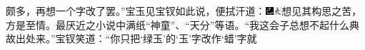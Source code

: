 颇多，再想一个字改了罢。''宝玉见宝钗如此说，便拭汗道：{\includegraphics[width=3mm]{../Images/00003}\includegraphics[width=3mm]{../Images/00012}\footnotesize \kaishu 想见其构思之苦，方是至情。最厌近之小说中满纸``神童''、``天分''等语。}``我这会子总想不起什么典故出处来。''宝钗笑道：``你只把`绿玉'的`玉'字改作`蜡'字就